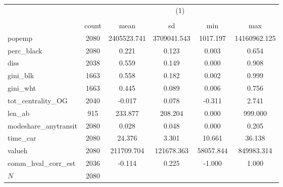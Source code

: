 {
\def\sym#1{\ifmmode^{#1}\else\(^{#1}\)\fi}
\begin{tabular}{l*{1}{ccccc}}
\toprule
            &\multicolumn{5}{c}{(1)}                                         \\
            &\multicolumn{5}{c}{}                                            \\
            &       count&        mean&          sd&         min&         max\\
\midrule
popemp      &        2080& 2405523.741& 3709041.543&    1017.197&14160962.125\\
perc\_black  &        2080&       0.221&       0.123&       0.003&       0.654\\
diss        &        2038&       0.559&       0.149&       0.000&       0.908\\
gini\_blk    &        1663&       0.558&       0.182&       0.002&       0.999\\
gini\_wht    &        1663&       0.445&       0.089&       0.006&       0.756\\
tot\_centrality\_OG&        2040&      -0.017&       0.078&      -0.311&       2.741\\
len\_ab      &         915&     233.877&     208.204&       0.000&     999.000\\
modeshare\_anytransit&        2080&       0.028&       0.048&       0.000&       0.205\\
time\_car    &        2080&      24.376&       3.301&      10.661&      36.138\\
valueh      &        2080&  211709.704&  121678.363&   58057.844&  849983.314\\
comm\_hval\_corr\_est&        2036&      -0.114&       0.225&      -1.000&       1.000\\
\midrule
\(N\)       &        2080&            &            &            &            \\
\bottomrule
\end{tabular}
}
